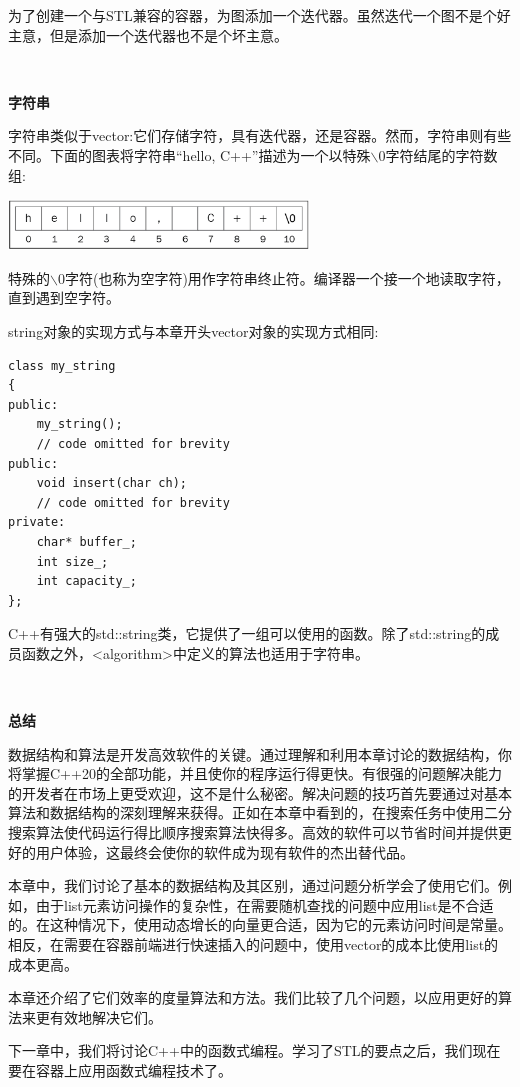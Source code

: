 为了创建一个与STL兼容的容器，为图添加一个迭代器。虽然迭代一个图不是个好主意，但是添加一个迭代器也不是个坏主意。 \par

\noindent\textbf{}\ \par
\textbf{字符串} \ \par
字符串类似于vector:它们存储字符，具有迭代器，还是容器。然而，字符串则有些不同。下面的图表将字符串“hello, C++”描述为一个以特殊$\backslash$0字符结尾的字符数组: \par

\begin{center}
	\includegraphics[width=0.6\textwidth]{content/Section-2/Chapter-6/30}
\end{center}

特殊的$\backslash$0字符(也称为空字符)用作字符串终止符。编译器一个接一个地读取字符，直到遇到空字符。 \par
string对象的实现方式与本章开头vector对象的实现方式相同: \par

\begin{lstlisting}[caption={}]
class my_string
{
public:
	my_string();
	// code omitted for brevity
public:
	void insert(char ch);
	// code omitted for brevity
private:
	char* buffer_;
	int size_;
	int capacity_;
};
\end{lstlisting}

C++有强大的std::string类，它提供了一组可以使用的函数。除了std::string的成员函数之外，<algorithm>中定义的算法也适用于字符串。 \par

\noindent\textbf{}\ \par
\textbf{总结} \ \par
数据结构和算法是开发高效软件的关键。通过理解和利用本章讨论的数据结构，你将掌握C++20的全部功能，并且使你的程序运行得更快。有很强的问题解决能力的开发者在市场上更受欢迎，这不是什么秘密。解决问题的技巧首先要通过对基本算法和数据结构的深刻理解来获得。正如在本章中看到的，在搜索任务中使用二分搜索算法使代码运行得比顺序搜索算法快得多。高效的软件可以节省时间并提供更好的用户体验，这最终会使你的软件成为现有软件的杰出替代品。 \par
本章中，我们讨论了基本的数据结构及其区别，通过问题分析学会了使用它们。例如，由于list元素访问操作的复杂性，在需要随机查找的问题中应用list是不合适的。在这种情况下，使用动态增长的向量更合适，因为它的元素访问时间是常量。相反，在需要在容器前端进行快速插入的问题中，使用vector的成本比使用list的成本更高。 \par
本章还介绍了它们效率的度量算法和方法。我们比较了几个问题，以应用更好的算法来更有效地解决它们。 \par
下一章中，我们将讨论C++中的函数式编程。学习了STL的要点之后，我们现在要在容器上应用函数式编程技术了。 \par

